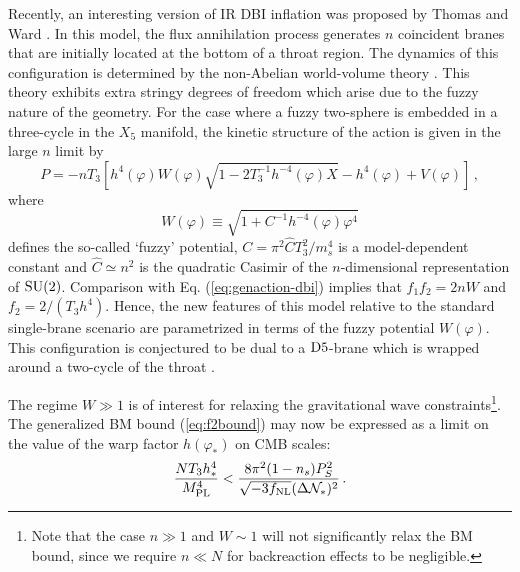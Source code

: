Recently, an interesting version of IR DBI inflation 
was proposed by Thomas and Ward \cite{thomasward}. In this model, the flux annihilation process 
generates $n$ coincident branes that are initially located at the 
bottom of a throat region. The dynamics of this configuration
is determined by the non-Abelian world-volume theory \cite{myers1,myers2}. 
This theory exhibits extra stringy degrees of freedom which arise due to the 
fuzzy nature of the geometry. For the case where a fuzzy two-sphere is 
embedded in a three-cycle in the $X_5$ manifold, 
the kinetic structure of the action is given in the large $n$ limit by 
\cite{thomasward}
% 
\begin{equation}
P=-nT_3 \left[ h^4(\varphi ) W(\varphi ) 
\sqrt{1-2 T_3^{-1} h^{-4}(\varphi) X}
-h^4(\varphi ) + V (\varphi ) \right] \,,
\end{equation}
% 
where
%    
\begin{equation} 
\label{eq:defW}
W (\varphi ) \equiv \sqrt{1+ C^{-1}h^{-4}(\varphi ) \varphi^4}
\end{equation}
% 
defines the so-called `fuzzy' potential, 
$C = \pi^2 \hat{C}T_3^2/m_s^4$ is a model-dependent constant and 
$\hat{C} \simeq n^2$ 
is the quadratic Casimir of the $n$-dimensional representation of 
${\rm SU}(2)$. 
Comparison with Eq. (\ref{eq:genaction-dbi}) 
implies that $f_1f_2 =2nW$ and $f_2=2/(T_3h^4)$. Hence, 
the new features of this model relative to the standard single-brane 
scenario are parametrized in terms of the fuzzy potential $W (\varphi )$. 
This configuration is conjectured to be dual to 
a ${\rm D5}$-brane which is wrapped around a two-cycle 
of the throat \cite{dual1,dual2,dual3}. 


The regime $W \gg 1$ is of interest for 
relaxing the gravitational wave constraints\footnote{Note that 
the case $n \gg 1$ and
$W \sim 1$ will not significantly relax the BM bound, 
since we require $n \ll N$ for backreaction effects to be negligible.}. 
The generalized BM bound (\ref{eq:f2bound}) may now be expressed as 
a limit on the value of the warp factor $h(\varphi_*)$ on CMB scales: 
% 
\begin{equation}
\label{eq:warptorelax}
\frac{NT_3h^4_*}{M_{\mathrm{PL}}^4} < 
\frac{8\pi^2 (1-n_s)P_S^2}{\sqrt{-3f_{\mathrm{NL}}}(\Delta {\cal{N}}_*)^2} \,.
\end{equation}
% 


